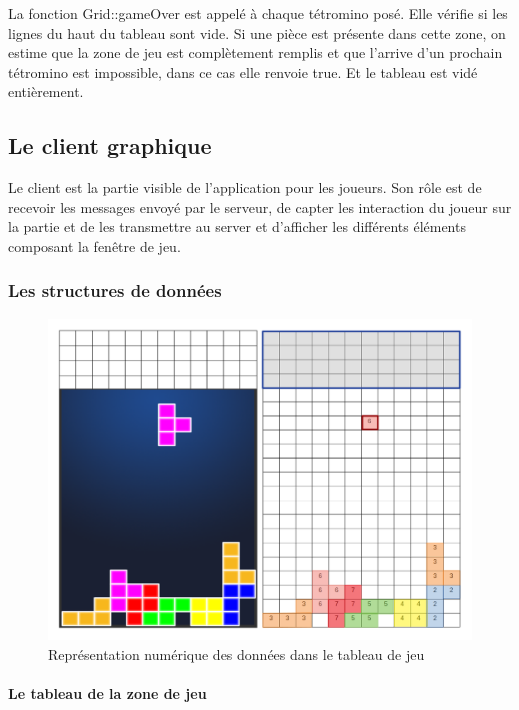 \documentclass[a4paper, 12pt]{article}
\begin{document}
				La fonction Grid::gameOver est appelé à chaque tétromino posé. Elle vérifie si les lignes du haut du tableau sont vide. Si une pièce est présente dans cette zone, on estime que la zone de jeu est complètement remplis et que l’arrive d’un prochain tétromino est impossible, dans ce cas elle renvoie true. Et le tableau est vidé entièrement.

	\subsection{Le client graphique}

		Le client est la partie visible de l’application pour les joueurs. Son rôle est de recevoir les messages envoyé par le serveur, de capter les interaction du joueur sur la partie et de les transmettre au server et d’afficher les différents éléments composant la fenêtre de jeu.

		\subsubsection{Les structures de données}

			\begin{figure}[bt]
				\centering
				\includegraphics[scale=0.35]{img/grid.png}
				\caption{Représentation numérique des données dans le tableau de jeu}
				\label{fig:grid}
			\end{figure}

			\paragraph{Le tableau de la zone de jeu}
\end{document}
